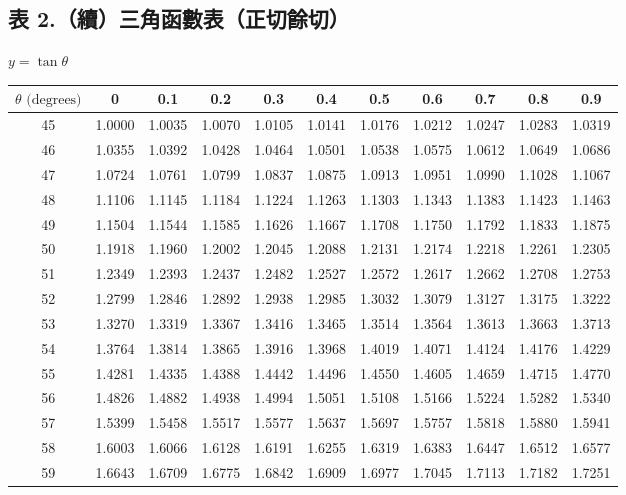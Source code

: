 \subsection*{表 2.\quad （續）三角函數表（正切餘切）}
\begin{center} $y = \tan\theta$ \end{center}
{\centering\fontsize{7.5pt}{8.8pt}\selectfont\setlength{\tabcolsep}{3.5pt}\renewcommand{\arraystretch}{0.96}
\begin{tabular}{|c|cccccccccc|}
\hline
$\theta\text{ (degrees)}$ & 0 & 0.1 & 0.2 & 0.3 & 0.4 & 0.5 & 0.6 & 0.7 & 0.8 & 0.9 \\ \hline
45 & 1.0000 & 1.0035 & 1.0070 & 1.0105 & 1.0141 & 1.0176 & 1.0212 & 1.0247 & 1.0283 & 1.0319 \\
46 & 1.0355 & 1.0392 & 1.0428 & 1.0464 & 1.0501 & 1.0538 & 1.0575 & 1.0612 & 1.0649 & 1.0686 \\
47 & 1.0724 & 1.0761 & 1.0799 & 1.0837 & 1.0875 & 1.0913 & 1.0951 & 1.0990 & 1.1028 & 1.1067 \\
48 & 1.1106 & 1.1145 & 1.1184 & 1.1224 & 1.1263 & 1.1303 & 1.1343 & 1.1383 & 1.1423 & 1.1463 \\
49 & 1.1504 & 1.1544 & 1.1585 & 1.1626 & 1.1667 & 1.1708 & 1.1750 & 1.1792 & 1.1833 & 1.1875 \\
\hline
50 & 1.1918 & 1.1960 & 1.2002 & 1.2045 & 1.2088 & 1.2131 & 1.2174 & 1.2218 & 1.2261 & 1.2305 \\
51 & 1.2349 & 1.2393 & 1.2437 & 1.2482 & 1.2527 & 1.2572 & 1.2617 & 1.2662 & 1.2708 & 1.2753 \\
52 & 1.2799 & 1.2846 & 1.2892 & 1.2938 & 1.2985 & 1.3032 & 1.3079 & 1.3127 & 1.3175 & 1.3222 \\
53 & 1.3270 & 1.3319 & 1.3367 & 1.3416 & 1.3465 & 1.3514 & 1.3564 & 1.3613 & 1.3663 & 1.3713 \\
54 & 1.3764 & 1.3814 & 1.3865 & 1.3916 & 1.3968 & 1.4019 & 1.4071 & 1.4124 & 1.4176 & 1.4229 \\
\hline
55 & 1.4281 & 1.4335 & 1.4388 & 1.4442 & 1.4496 & 1.4550 & 1.4605 & 1.4659 & 1.4715 & 1.4770 \\
56 & 1.4826 & 1.4882 & 1.4938 & 1.4994 & 1.5051 & 1.5108 & 1.5166 & 1.5224 & 1.5282 & 1.5340 \\
57 & 1.5399 & 1.5458 & 1.5517 & 1.5577 & 1.5637 & 1.5697 & 1.5757 & 1.5818 & 1.5880 & 1.5941 \\
58 & 1.6003 & 1.6066 & 1.6128 & 1.6191 & 1.6255 & 1.6319 & 1.6383 & 1.6447 & 1.6512 & 1.6577 \\
59 & 1.6643 & 1.6709 & 1.6775 & 1.6842 & 1.6909 & 1.6977 & 1.7045 & 1.7113 & 1.7182 & 1.7251 \\

\end{tabular}}
